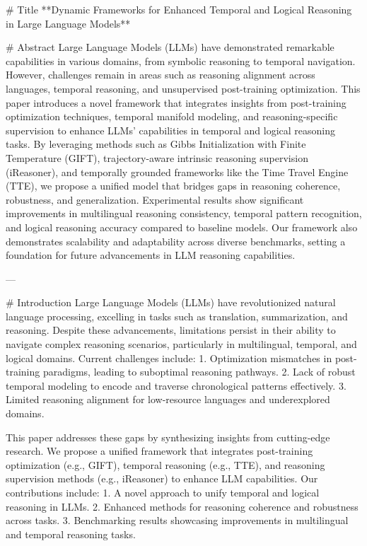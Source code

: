 # Title  
**Dynamic Frameworks for Enhanced Temporal and Logical Reasoning in Large Language Models**

# Abstract  
Large Language Models (LLMs) have demonstrated remarkable capabilities in various domains, from symbolic reasoning to temporal navigation. However, challenges remain in areas such as reasoning alignment across languages, temporal reasoning, and unsupervised post-training optimization. This paper introduces a novel framework that integrates insights from post-training optimization techniques, temporal manifold modeling, and reasoning-specific supervision to enhance LLMs' capabilities in temporal and logical reasoning tasks. By leveraging methods such as Gibbs Initialization with Finite Temperature (GIFT), trajectory-aware intrinsic reasoning supervision (iReasoner), and temporally grounded frameworks like the Time Travel Engine (TTE), we propose a unified model that bridges gaps in reasoning coherence, robustness, and generalization. Experimental results show significant improvements in multilingual reasoning consistency, temporal pattern recognition, and logical reasoning accuracy compared to baseline models. Our framework also demonstrates scalability and adaptability across diverse benchmarks, setting a foundation for future advancements in LLM reasoning capabilities.

---

# Introduction  
Large Language Models (LLMs) have revolutionized natural language processing, excelling in tasks such as translation, summarization, and reasoning. Despite these advancements, limitations persist in their ability to navigate complex reasoning scenarios, particularly in multilingual, temporal, and logical domains. Current challenges include:  
1. Optimization mismatches in post-training paradigms, leading to suboptimal reasoning pathways.  
2. Lack of robust temporal modeling to encode and traverse chronological patterns effectively.  
3. Limited reasoning alignment for low-resource languages and underexplored domains.  

This paper addresses these gaps by synthesizing insights from cutting-edge research. We propose a unified framework that integrates post-training optimization (e.g., GIFT), temporal reasoning (e.g., TTE), and reasoning supervision methods (e.g., iReasoner) to enhance LLM capabilities. Our contributions include:  
1. A novel approach to unify temporal and logical reasoning in LLMs.  
2. Enhanced methods for reasoning coherence and robustness across tasks.  
3. Benchmarking results showcasing improvements in multilingual and temporal reasoning tasks.  

